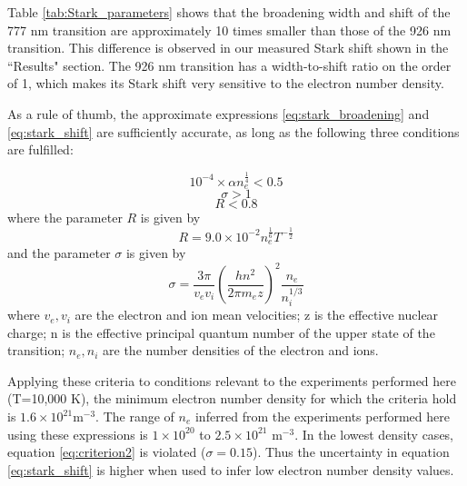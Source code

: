 \documentclass[12pt]{iopart}
\begin{document}
Table \ref{tab:Stark_parameters} shows that the broadening width and shift of the 777 nm transition are approximately 10 times smaller than those of the 926 nm transition. This difference is observed in our measured Stark shift shown in the ``Results" section. The 926 nm transition has a width-to-shift ratio on the order of 1, which makes its Stark shift very sensitive to the electron number density. 

As a rule of thumb, the approximate expressions \ref{eq:stark_broadening} and \ref{eq:stark_shift} are sufficiently accurate, as long as the following three conditions are fulfilled\cite{Baer1992c}:

\begin{equation}\label{eq:criterion1}
    10^{-4}\times\alpha n_e^{\frac{1}{4}} < 0.5
\end{equation}
\begin{equation}\label{eq:criterion2}
    \sigma >1
\end{equation}
\begin{equation}\label{eq:criterion3}
    R<0.8
\end{equation}
where the parameter $R$ is given by 
\begin{equation}
    R = 9.0 \times 10^{-2} n_e^{\frac{1}{6}}T^{-\frac{1}{2}}
\end{equation}
and the parameter $\sigma$ is given by
\begin{equation}
    \sigma = \frac{3\pi}{v_ev_i}\left(\frac{hn^2}{2\pi m_ez}\right)^2 \frac{n_e}{n_i^{1/3}}
\end{equation}
where $v_e,v_i$ are the electron and ion mean velocities; z is the effective nuclear charge; n is the effective principal quantum number of the upper state of the transition; $n_e,n_i$ are the number densities of the electron and ions.


Applying these criteria to conditions relevant to the experiments performed here (T=10,000 K), the minimum electron number density for which the criteria hold is $1.6\times10^{21}$m$^{-3}$. The range of $n_e$ inferred from the experiments performed here using these expressions is $1\times10^{20}$ to $2.5\times10^{21}$ m$^{-3}$. In the lowest density cases, equation \ref{eq:criterion2} is violated ($\sigma=0.15$). Thus the uncertainty in equation \ref{eq:stark_shift} is higher when used to infer low electron number density values.
\end{document}

